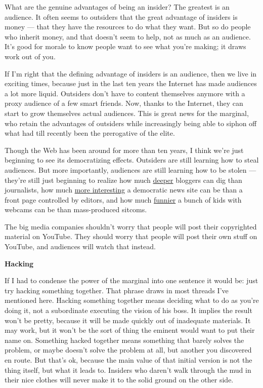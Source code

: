 \documentclass[12pt]{book}
\begin{document}
What are the genuine advantages of being an insider? The greatest is an
audience. It often seems to outsiders that the great advantage of
insiders is money --- that they have the resources to do what they want.
But so do people who inherit money, and that doesn't seem to help, not
as much as an audience. It's good for morale to know people want to see
what you're making; it draws work out of you.

If I'm right that the defining advantage of insiders is an audience,
then we live in exciting times, because just in the last ten years the
Internet has made audiences a lot more liquid. Outsiders don't have to
content themselves anymore with a proxy audience of a few smart friends.
Now, thanks to the Internet, they can start to grow themselves actual
audiences. This is great news for the marginal, who retain the
advantages of outsiders while increasingly being able to siphon off what
had till recently been the prerogative of the elite.

Though the Web has been around for more than ten years, I think we're
just beginning to see its democratizing effects. Outsiders are still
learning how to steal audiences. But more importantly, audiences are
still learning how to be stolen --- they're still just beginning to
realize how much
\href{http://journalism.nyu.edu/pubzone/weblogs/pressthink/2004/03/15/lott_case.html}{deeper}
bloggers can dig than journalists, how much
\href{http://reddit.com}{more interesting} a democratic news site can be
than a front page controlled by editors, and how much
\href{http://www.youtube.com/watch?v=SLbFDMplZDs}{funnier} a bunch of
kids with webcams can be than mass-produced sitcoms.

The big media companies shouldn't worry that people will post their
copyrighted material on YouTube. They should worry that people will post
their own stuff on YouTube, and audiences will watch that instead.

\textbf{Hacking}

If I had to condense the power of the marginal into one sentence it
would be: just try hacking something together. That phrase draws in most
threads I've mentioned here. Hacking something together means deciding
what to do as you're doing it, not a subordinate executing the vision of
his boss. It implies the result won't be pretty, because it will be made
quickly out of inadequate materials. It may work, but it won't be the
sort of thing the eminent would want to put their name on. Something
hacked together means something that barely solves the problem, or maybe
doesn't solve the problem at all, but another you discovered en route.
But that's ok, because the main value of that initial version is not the
thing itself, but what it leads to. Insiders who daren't walk through
the mud in their nice clothes will never make it to the solid ground on
the other side.
\end{document}
